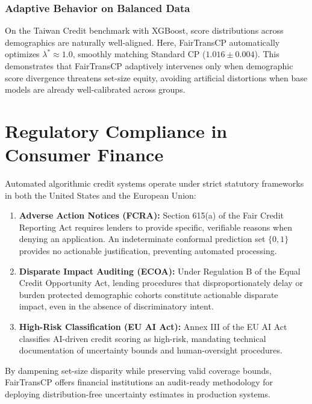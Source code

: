 \documentclass[conference]{IEEEtran}
\begin{document}
\subsubsection{Adaptive Behavior on Balanced Data}
On the Taiwan Credit benchmark with XGBoost, score distributions across demographics are naturally well-aligned. Here, FairTransCP automatically optimizes $\lambda^* \approx 1.0$, smoothly matching Standard CP ($1.016 \pm 0.004$). This demonstrates that FairTransCP adaptively intervenes only when demographic score divergence threatens set-size equity, avoiding artificial distortions when base models are already well-calibrated across groups.

\section{Regulatory Compliance in Consumer Finance}
Automated algorithmic credit systems operate under strict statutory frameworks in both the United States and the European Union:
\begin{enumerate}
    \item \textbf{Adverse Action Notices (FCRA):} Section 615(a) of the Fair Credit Reporting Act requires lenders to provide specific, verifiable reasons when denying an application. An indeterminate conformal prediction set $\{0, 1\}$ provides no actionable justification, preventing automated processing.
    \item \textbf{Disparate Impact Auditing (ECOA):} Under Regulation B of the Equal Credit Opportunity Act, lending procedures that disproportionately delay or burden protected demographic cohorts constitute actionable disparate impact, even in the absence of discriminatory intent.
    \item \textbf{High-Risk Classification (EU AI Act):} Annex III of the EU AI Act classifies AI-driven credit scoring as high-risk, mandating technical documentation of uncertainty bounds and human-oversight procedures.
\end{enumerate}
By dampening set-size disparity while preserving valid coverage bounds, FairTransCP offers financial institutions an audit-ready methodology for deploying distribution-free uncertainty estimates in production systems.

\end{document}

